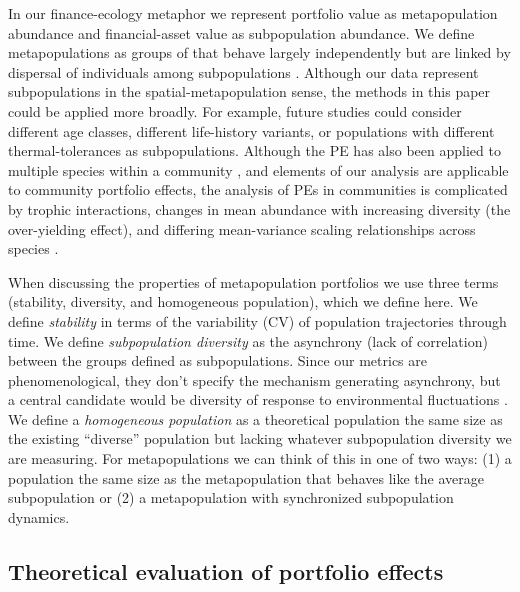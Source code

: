 In our finance-ecology metaphor we represent portfolio value as
metapopulation abundance and financial-asset value as subpopulation abundance.
We define metapopulations as groups of  that behave largely
independently but are linked by dispersal of individuals among subpopulations
\citep{levins1969}.
Although our data represent subpopulations in the spatial-metapopulation
sense, the methods in this paper could be applied more broadly.
For example, future studies could consider different age classes, different
life-history variants, or populations with different thermal-tolerances as
subpopulations.
Although the PE has also been applied to multiple species within a
community \citep[e.g.][]{doak1998, tilman1998, karp2011}, and
elements of our analysis are applicable to community portfolio effects, the
analysis of PEs in communities is complicated by trophic interactions, changes
in mean abundance with increasing diversity (the over-yielding effect), and
differing mean-variance scaling relationships across species
\citep[e.g.][]{loreau2010a, thibaut2013}.

When discussing the properties of metapopulation portfolios we use
three terms (stability, diversity, and homogeneous population), which we define
here.
We define \textit{stability} in terms of the variability (CV) of population
trajectories through time.
We define \textit{subpopulation diversity} as the asynchrony (lack of
correlation) between the groups defined as subpopulations.
Since our metrics are phenomenological, they don't specify the mechanism
generating asynchrony, but a central candidate would be diversity of response
to environmental fluctuations
\citep[e.g.][]{elmqvist2003,loreau2008,thibaut2012}.
We define a \textit{homogeneous population} as a theoretical population the
same size as the existing ``diverse'' population but lacking whatever
subpopulation diversity we are measuring. For metapopulations we can think of
this in one of two ways: (1) a population the same size as the metapopulation
that behaves like the average subpopulation or (2) a metapopulation with synchronized
subpopulation dynamics.

\subsection{Theoretical evaluation of portfolio effects}

